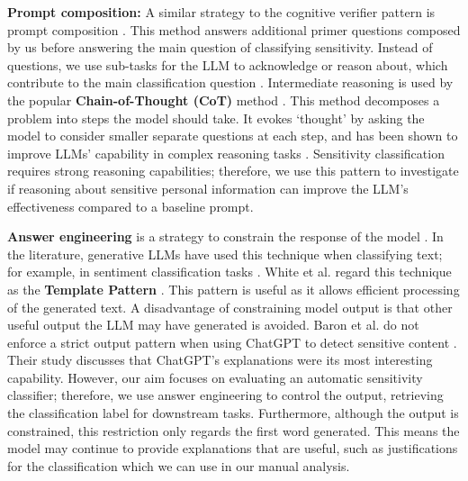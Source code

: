 \textbf{Prompt composition:} A similar strategy to the cognitive verifier pattern is prompt composition \cite{liu2023pre}. This method answers additional primer questions composed by us before answering the main question of classifying sensitivity. Instead of questions, we use sub-tasks for the LLM to acknowledge or reason about, which contribute to the main classification question \cite{han2022ptr}. Intermediate reasoning is used by the popular \textbf{Chain-of-Thought (CoT)} method \cite{wei2022chain, fei2023reasoning}. This method decomposes a problem into steps the model should take. It evokes ‘thought’ by asking the model to consider smaller separate questions at each step, and has been shown to improve LLMs' capability in complex reasoning tasks \cite{wei2022chain}. Sensitivity classification requires strong reasoning capabilities; therefore, we use this pattern to investigate if reasoning about sensitive personal information can improve the LLM's effectiveness compared to a baseline prompt.

\textbf{Answer engineering} is a strategy to constrain the response of the model \cite{liu2023pre}. In the literature, generative LLMs have used this technique when classifying text; for example, in sentiment classification tasks \cite{yin2019benchmarking, kocon2023chatgpt}. White et al. regard this technique as the \textbf{Template Pattern} \cite{white2023prompt}. This pattern is useful as it allows efficient processing of the generated text. A disadvantage of constraining model output is that other useful output the LLM may have generated is avoided. Baron et al. do not enforce a strict output pattern when using ChatGPT to detect sensitive content \cite{baron2023using}. Their study discusses that ChatGPT's explanations were its most interesting capability. However, our aim focuses on evaluating an automatic sensitivity classifier; therefore, we use answer engineering to control the output, retrieving the classification label for downstream tasks. Furthermore, although the output is constrained, this restriction only regards the first word generated. This means the model may continue to provide explanations that are useful, such as justifications for the classification which we can use in our manual analysis.


